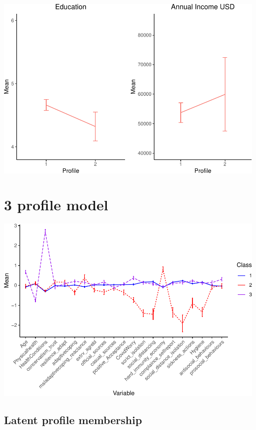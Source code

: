 \documentclass[]{article}
\begin{document}
\includegraphics{lpa_analyses_files/figure-latex/unnamed-chunk-9-1.pdf}

\newpage

\hypertarget{profile-model-1}{%
\section{3 profile model}\label{profile-model-1}}

\includegraphics{lpa_analyses_files/figure-latex/unnamed-chunk-10-1.pdf}

\hypertarget{latent-profile-membership-1}{%
\subsection{Latent profile
membership}\label{latent-profile-membership-1}}
\end{document}
